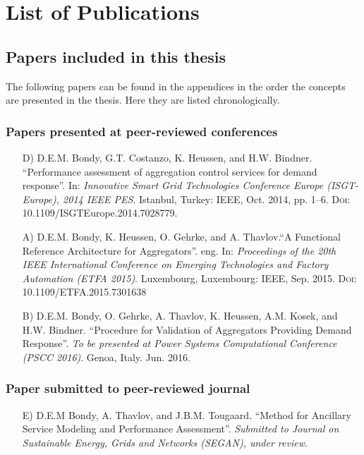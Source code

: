 \chapter{List of Publications}
\section*{Papers included in this thesis}
The following papers can be found in the appendices in the order the concepts are presented in the thesis. Here they are listed chronologically.
\subsection*{Papers presented at peer-reviewed conferences}
\begin{itemize}
	\item[D)] D.E.M. Bondy, G.T. Costanzo, K. Heussen, and H.W. Bindner. ``Performance assessment of aggregation control services for demand response''. In: \emph{Innovative Smart Grid Technologies Conference Europe (ISGT-Europe), 2014 IEEE PES}. Istanbul, Turkey: IEEE, Oct. 2014, pp. 1–6. \textsc{Doi}: 10.1109/ISGTEurope.2014.7028779.
	\item[A)] D.E.M. Bondy, K. Heussen, O. Gehrke, and A. Thavlov.``A Functional Reference Architecture for Aggregators''. eng. In: \emph{Proceedings of the 20th IEEE International Conference on Emerging Technologies and Factory Automation (ETFA 2015)}. Luxembourg, Luxembourg: IEEE, Sep. 2015. \textsc{Doi}: 10.1109/ETFA.2015.7301638
	\item[B)] D.E.M. Bondy, O. Gehrke, A. Thavlov, K. Heussen, A.M. Kosek, and H.W. Bindner. ``Procedure for Validation of Aggregators Providing Demand Response''. \emph{To be presented at Power Systems Computational Conference (PSCC 2016)}. Genoa, Italy. Jun. 2016.
\end{itemize}

\subsection*{Paper submitted to peer-reviewed journal}
\begin{itemize}
	\item[E)] D.E.M Bondy, A. Thavlov, and J.B.M. Tougaard. ``Method for Ancillary Service Modeling and Performance Assessment''. \emph{Submitted to Journal on Sustainable Energy, Grids and Networks (SEGAN), under review}.
\end{itemize}


